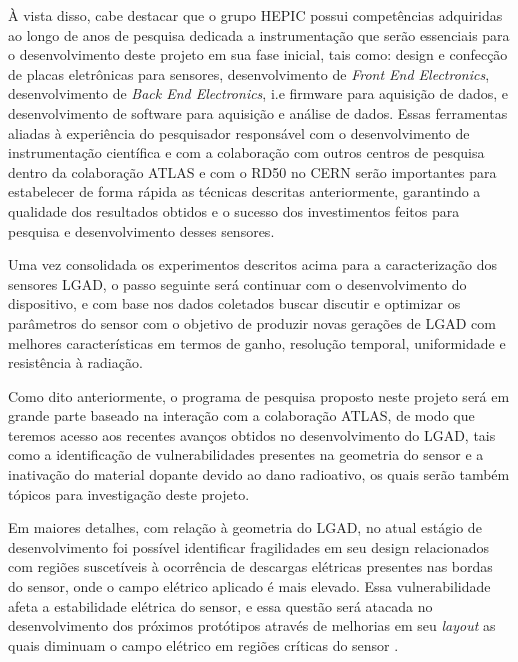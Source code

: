 À vista disso, cabe destacar que o grupo HEPIC possui competências adquiridas ao longo de anos de pesquisa dedicada a instrumentação que serão essenciais para o desenvolvimento deste projeto em sua fase inicial, tais como: design e confecção de placas eletrônicas para sensores, desenvolvimento de {\it Front End Electronics}, desenvolvimento de {\it Back End Electronics}, i.e firmware para aquisição de dados, e desenvolvimento de software para aquisição e análise de dados. Essas ferramentas aliadas à experiência do pesquisador responsável com o desenvolvimento de instrumentação científica \cite{tpcNIM,discharge_paper,THGEM} e com a colaboração com outros centros de pesquisa dentro da colaboração ATLAS e com o RD50 no CERN serão importantes para estabelecer de forma rápida as técnicas descritas anteriormente, garantindo a qualidade dos resultados obtidos e o sucesso dos investimentos feitos para pesquisa e desenvolvimento desses sensores. 

Uma vez consolidada os experimentos descritos acima para a caracterização dos sensores LGAD, o passo seguinte será continuar com o desenvolvimento do dispositivo, e com base nos dados coletados buscar discutir e optimizar os parâmetros do sensor com o objetivo de produzir novas gerações de LGAD com melhores características em termos de ganho, resolução temporal, uniformidade e resistência à radiação. 

Como dito anteriormente, o programa de pesquisa proposto neste projeto será em grande parte baseado na interação com a colaboração ATLAS, de modo que teremos acesso aos recentes avanços obtidos no desenvolvimento do LGAD, tais como a identificação de vulnerabilidades presentes na geometria do sensor e a inativação do material dopante devido ao dano radioativo, os quais serão também tópicos para investigação deste projeto.

Em maiores detalhes, com relação à geometria do LGAD, no atual estágio de desenvolvimento foi possível identificar fragilidades em seu design relacionados com regiões suscetíveis à ocorrência de descargas elétricas presentes nas bordas do sensor, onde o campo elétrico aplicado é mais elevado. Essa vulnerabilidade afeta a estabilidade elétrica do sensor, e essa questão será atacada no desenvolvimento dos próximos protótipos através de melhorias em seu {\it layout} as quais diminuam o campo elétrico em regiões críticas do sensor \cite{tdr}.  

